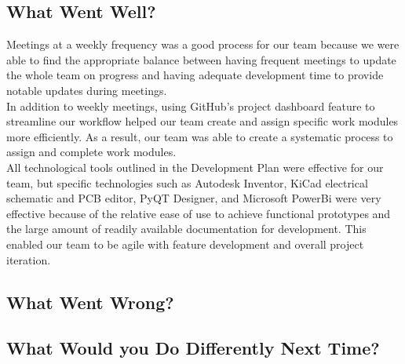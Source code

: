 \documentclass{article}
\begin{document}
\subsection{What Went Well?}


Meetings at a weekly frequency was a good process for our team because we were able to find the appropriate balance between having frequent meetings to update the whole team on progress and having adequate development time to provide notable updates during meetings. \\

In addition to weekly meetings, using GitHub's project dashboard feature to streamline our workflow helped our team create and assign specific work modules more efficiently. As a result, our team was able to create a systematic process to assign and complete work modules. \\

All technological tools outlined in the Development Plan were effective for our team, but specific technologies such as Autodesk Inventor, KiCad electrical schematic and PCB editor, PyQT Designer, and Microsoft PowerBi were very effective because of the relative ease of use to achieve functional prototypes and the large amount of readily available documentation for development. This enabled our team to be agile with feature development and overall project iteration. 

\subsection{What Went Wrong?}


\subsection{What Would you Do Differently Next Time?}

\end{document}
